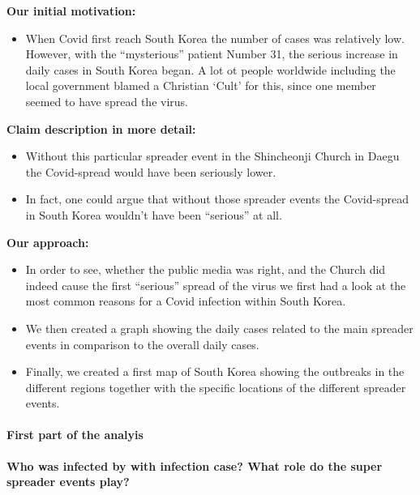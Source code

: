 \documentclass[
]{article}
\providecommand{\tightlist}{%
  \setlength{\itemsep}{0pt}\setlength{\parskip}{0pt}}
\begin{document}
\textbf{Our initial motivation:}

\begin{itemize}
\tightlist
\item
  When Covid first reach South Korea the number of cases was relatively
  low. However, with the ``mysterious'' patient Number 31, the serious
  increase in daily cases in South Korea began. A lot ot people
  worldwide including the local government blamed a Christian `Cult' for
  this, since one member seemed to have spread the virus.
\end{itemize}

\textbf{Claim description in more detail:}

\begin{itemize}
\tightlist
\item
  Without this particular spreader event in the Shincheonji Church in
  Daegu the Covid-spread would have been seriously lower.
\item
  In fact, one could argue that without those spreader events the
  Covid-spread in South Korea wouldn't have been ``serious'' at all.
\end{itemize}

\textbf{Our approach:}

\begin{itemize}
\tightlist
\item
  In order to see, whether the public media was right, and the Church
  did indeed cause the first ``serious'' spread of the virus we first
  had a look at the most common reasons for a Covid infection within
  South Korea.
\item
  We then created a graph showing the daily cases related to the main
  spreader events in comparison to the overall daily cases.
\item
  Finally, we created a first map of South Korea showing the outbreaks
  in the different regions together with the specific locations of the
  different spreader events.
\end{itemize}

\hypertarget{first-part-of-the-analyis}{%
\paragraph{First part of the analyis}\label{first-part-of-the-analyis}}

\textbf{Who was infected by with infection case? What role do the super
spreader events play?}

~
\end{document}

